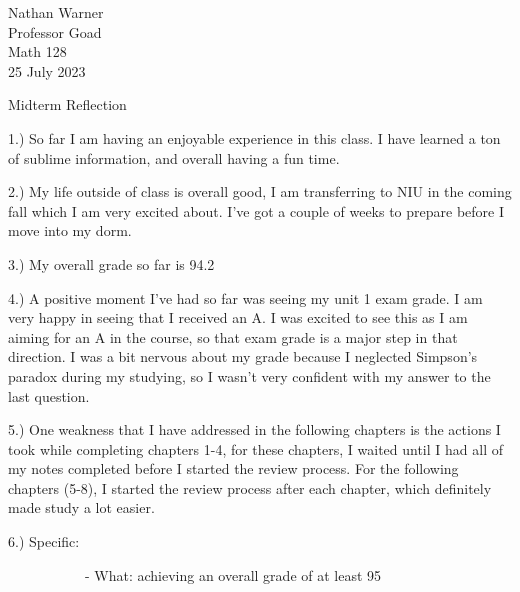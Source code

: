 \documentclass[12pt]{article}
\begin{document}
\begin{flushleft}

Nathan Warner\\
Professor Goad\\
Math 128\\
25 July 2023
 \\


\begin{center}
    Midterm Reflection
\end{center}


\setlength{\parindent}{0.5in}
1.) So far I am having an enjoyable experience in this class. I have learned a ton of sublime information, and overall having a fun time.

2.) My life outside of class is overall good, I am transferring to NIU in the coming fall which I am very excited about. I've got a couple of weeks to prepare before I move into my dorm.

3.) My overall grade so far is 94.2%

4.) A positive moment I've had so far was seeing my unit 1 exam grade. I am very happy in seeing that I received an A. I was excited to see this as I am aiming for an A in the course, so that exam grade is a major step in that direction. I was a bit nervous about my grade because I neglected Simpson's paradox during my studying, so I wasn't very confident with my answer to the last question.

5.) One weakness that I have addressed in the following chapters is the actions I took while completing chapters 1-4, for these chapters, I waited until I had all of my notes completed before I started the review process. For the following chapters (5-8), I started the review process after each chapter, which definitely made study a lot easier.

6.) Specific:

             - What: achieving an overall grade of at least 95%


\end{flushleft}
\end{document}
